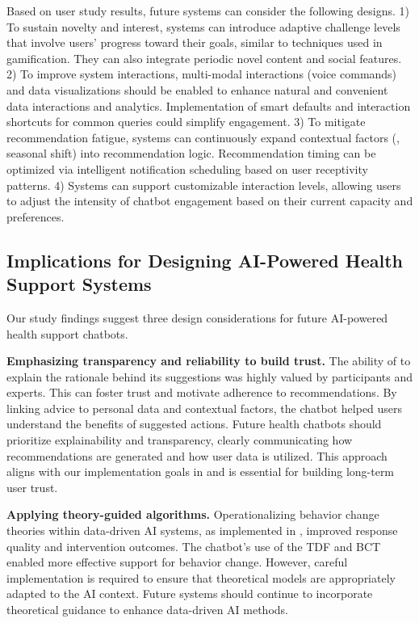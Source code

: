 Based on user study results, future systems can consider the following designs.
1) To sustain novelty and interest, systems can introduce adaptive challenge levels that involve users' progress toward their goals, similar to techniques used in gamification. They can also integrate periodic novel content and social features.
2) To improve system interactions, multi-modal interactions (\eg voice commands) and data visualizations should be enabled to enhance natural and convenient data interactions and analytics. Implementation of smart defaults and interaction shortcuts for common queries could simplify engagement.
3) To mitigate recommendation fatigue, systems can continuously expand contextual factors (\eg, seasonal shift) into recommendation logic.
Recommendation timing can be optimized via intelligent notification scheduling based on user receptivity patterns.
4) Systems can support customizable interaction levels, allowing users to adjust the intensity of chatbot engagement based on their current capacity and preferences.



\subsection{Implications for Designing AI-Powered Health Support Systems}
Our study findings suggest three design considerations for future AI-powered health support chatbots.


\par{}\textbf{Emphasizing transparency and reliability to build trust.}
The ability of \name{} to explain the rationale behind its suggestions was highly valued by participants and experts. This can foster trust and motivate adherence to recommendations. By linking advice to personal data and contextual factors, the chatbot helped users understand the benefits of suggested actions. Future health chatbots should prioritize explainability and transparency, clearly communicating how recommendations are generated and how user data is utilized.
This approach aligns with our implementation goals in \name{} and is essential for building long-term user trust.

\par{}\textbf{Applying theory-guided algorithms.}
Operationalizing behavior change theories within data-driven AI systems, as implemented in \name{}, improved response quality and intervention outcomes. The chatbot's use of the TDF and BCT enabled more effective support for behavior change. 
However, careful implementation is required to ensure that theoretical models are appropriately adapted to the AI context. Future systems should continue to incorporate theoretical guidance to enhance data-driven AI methods.

